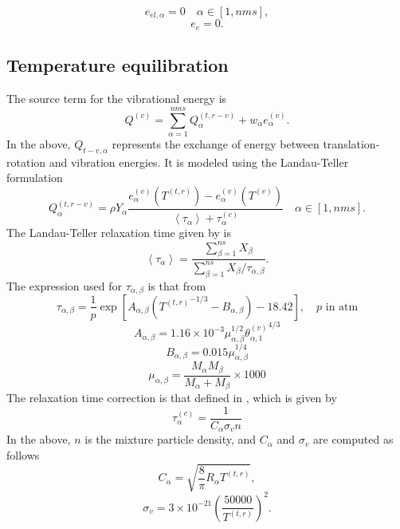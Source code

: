 \documentclass[oneside,a4paper,11pt]{report}
\begin{document}
\begin{equation}
e_{el,\alpha} = 0  \quad \alpha \in [1,nms],
\end{equation}
\begin{equation}
e_e = 0.
\end{equation}

\subsection{Temperature equilibration}
The source term for the vibrational energy is 
\begin{equation}
Q^{(v)} = \sum_{\alpha = 1}^{nms} Q^{(t,r-v)}_\alpha + w_\alpha e^{(v)}_\alpha.
\end{equation}
In the above, $Q_{t-v,\alpha}$ represents the exchange of energy between translation-rotation and vibration energies. It is modeled using the Landau-Teller formulation
\begin{equation}
Q^{(t,r-v)}_\alpha = \rho Y_\alpha \frac{ e^{(v)}_\alpha (T^{(t,r)}) - e^{(v)}_\alpha(T^{(v)}) }{ \left < \tau_\alpha \right > + \tau^{(c)}_\alpha } \quad \alpha \in [1,nms]. 
\end{equation}
The Landau-Teller relaxation time given by \cite{lee1985} is
\begin{equation}
\left < \tau_\alpha \right > = \frac{ \sum_{\beta = 1}^{ns} X_\beta}{ \sum_{\beta = 1}^{ns} X_\beta / \tau_{\alpha,\beta}}.
\end{equation}
The expression used for $\tau_{\alpha,\beta}$ is that from \cite{millikan1963}
\begin{equation}
\tau_{\alpha,\beta} = \frac{1}{p} \exp \left [ A_{\alpha,\beta} \left ( \left. T^{(t,r)} \right .^{-1/3} - B_{\alpha,\beta} \right ) - 18.42 \right ], \quad p \text{ in atm}
\end{equation}
\begin{equation}
A_{\alpha,\beta} = 1.16 \times 10^{-3} \mu_{\alpha,\beta}^{1/2} \left .\theta_{\alpha,1}^{(v)} \right.^{4/3}
\end{equation}
\begin{equation}
B_{\alpha,\beta} = 0.015 \mu_{\alpha,\beta}^{1/4}
\end{equation}
\begin{equation}
\mu_{\alpha,\beta} = \frac{M_{\alpha} M_{\beta}}{ M_\alpha + M_\beta} \times 1000
\end{equation}
The relaxation time correction is that defined in \cite{park1990}, which is given by
\begin{equation}
\tau^{(c)}_\alpha = \frac{1}{C_\alpha \sigma_v n}
\end{equation}
In the above, $n$ is the mixture particle density, and $C_\alpha$ and $\sigma_v$ are computed as follows
\begin{equation}
C_\alpha = \sqrt{ \frac{8}{\pi} R_\alpha T^{(t,r)}},
\end{equation}
\begin{equation}
\sigma_v = 3 \times 10^{-21} \left ( \frac{50000}{T^{(t,r)}} \right )^2.
\end{equation}
\end{document}

